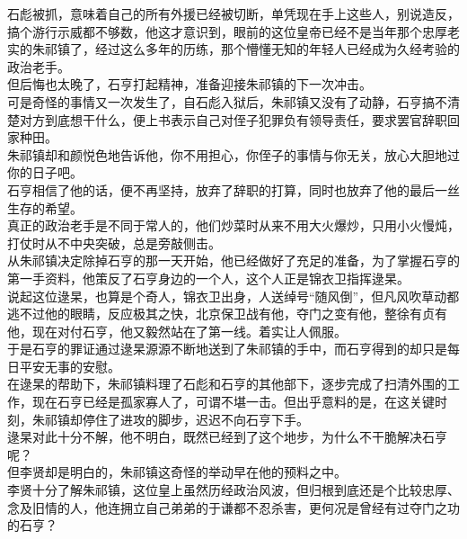 \begin{multicols}{\theparacolNo}
石彪被抓，意味着自己的所有外援已经被切断，单凭现在手上这些人，别说造反，搞个游行示威都不够数，他这才意识到，眼前的这位皇帝已经不是当年那个忠厚老实的朱祁镇了，经过这么多年的历练，那个懵懂无知的年轻人已经成为久经考验的政治老手。\\

但后悔也太晚了，石亨打起精神，准备迎接朱祁镇的下一次冲击。\\

可是奇怪的事情又一次发生了，自石彪入狱后，朱祁镇又没有了动静，石亨搞不清楚对方到底想干什么，便上书表示自己对侄子犯罪负有领导责任，要求罢官辞职回家种田。\\

朱祁镇却和颜悦色地告诉他，你不用担心，你侄子的事情与你无关，放心大胆地过你的日子吧。\\

石亨相信了他的话，便不再坚持，放弃了辞职的打算，同时也放弃了他的最后一丝生存的希望。\\

真正的政治老手是不同于常人的，他们炒菜时从来不用大火爆炒，只用小火慢炖，打仗时从不中央突破，总是旁敲侧击。\\

从朱祁镇决定除掉石亨的那一天开始，他已经做好了充足的准备，为了掌握石亨的第一手资料，他策反了石亨身边的一个人，这个人正是锦衣卫指挥逯杲。\\

说起这位逯杲，也算是个奇人，锦衣卫出身，人送绰号“随风倒”，但凡风吹草动都逃不过他的眼睛，反应极其之快，北京保卫战有他，夺门之变有他，整徐有贞有他，现在对付石亨，他又毅然站在了第一线。着实让人佩服。\\

于是石亨的罪证通过逯杲源源不断地送到了朱祁镇的手中，而石亨得到的却只是每日平安无事的安慰。\\

在逯杲的帮助下，朱祁镇料理了石彪和石亨的其他部下，逐步完成了扫清外围的工作，现在石亨已经是孤家寡人了，可谓不堪一击。但出乎意料的是，在这关键时刻，朱祁镇却停住了进攻的脚步，迟迟不向石亨下手。\\

逯杲对此十分不解，他不明白，既然已经到了这个地步，为什么不干脆解决石亨呢？\\

但李贤却是明白的，朱祁镇这奇怪的举动早在他的预料之中。\\

李贤十分了解朱祁镇，这位皇上虽然历经政治风波，但归根到底还是个比较忠厚、念及旧情的人，他连拥立自己弟弟的于谦都不忍杀害，更何况是曾经有过夺门之功的石亨？\\


\end{multicols}
